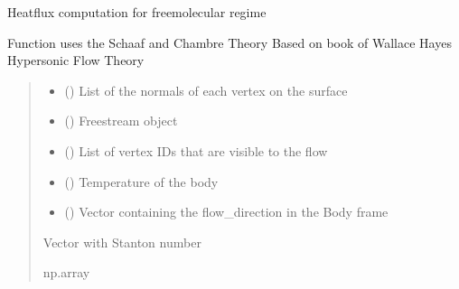 \documentclass[letterpaper,10pt,english]{sphinxmanual}
\begin{document}
\begin{fulllineitems}
\label{\detokenize{modules:aerothermo.aerothermodynamics_module_freemolecular}}
\pysigstartsignatures
{}
\pysigstopsignatures
\sphinxAtStartPar
Heatflux computation for free\sphinxhyphen{}molecular regime

\sphinxAtStartPar
Function uses the Schaaf and Chambre Theory
Based on book of Wallace Hayes \sphinxhyphen{} Hypersonic Flow Theory
\begin{quote}\begin{description}
\begin{itemize}
\item {} 
\sphinxAtStartPar
{} () \textendash{} List of the normals of each vertex on the surface

\item {} 
\sphinxAtStartPar
{} () \textendash{} Freestream object

\item {} 
\sphinxAtStartPar
{} () \textendash{} List of vertex IDs that are visible to the flow

\item {} 
\sphinxAtStartPar
{} () \textendash{} Temperature of the body

\item {} 
\sphinxAtStartPar
{} () \textendash{} Vector containing the flow\_direction in the Body frame

\end{itemize}

\sphinxAtStartPar
{} \textendash{} Vector with Stanton number

\sphinxAtStartPar
np.array

\end{description}\end{quote}

\end{fulllineitems}
\end{document}
